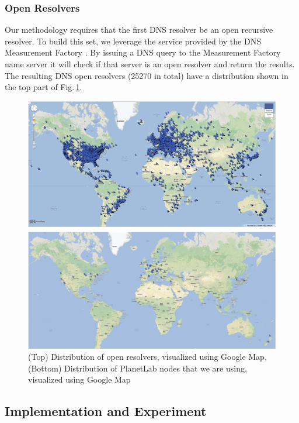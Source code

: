 \subsubsection{Open Resolvers}
Our methodology requires that the first DNS resolver be an open recursive resolver. To build this set, we leverage the service provided by the DNS Measurement Factory \cite{dnsfactory}. By issuing a DNS query to the Measurement Factory name server it will check if that server is an open resolver and return the results. The resulting DNS open resolvers (25270 in total) have a distribution shown in the top part of Fig.\,\ref{fig:geo_viz}.

\begin{figure}
  \centering
  \includegraphics[width=\linewidth]{../figs/geo_viz.pdf}
  \vspace{-1em}
  \caption{(Top) Distribution of open resolvers, visualized using Google Map, (Bottom) Distribution of PlanetLab nodes that we are using, visualized using Google Map}
  \label{fig:geo_viz}
\end{figure}

\subsection{Implementation and Experiment}
\label{sec:impl-exper}

